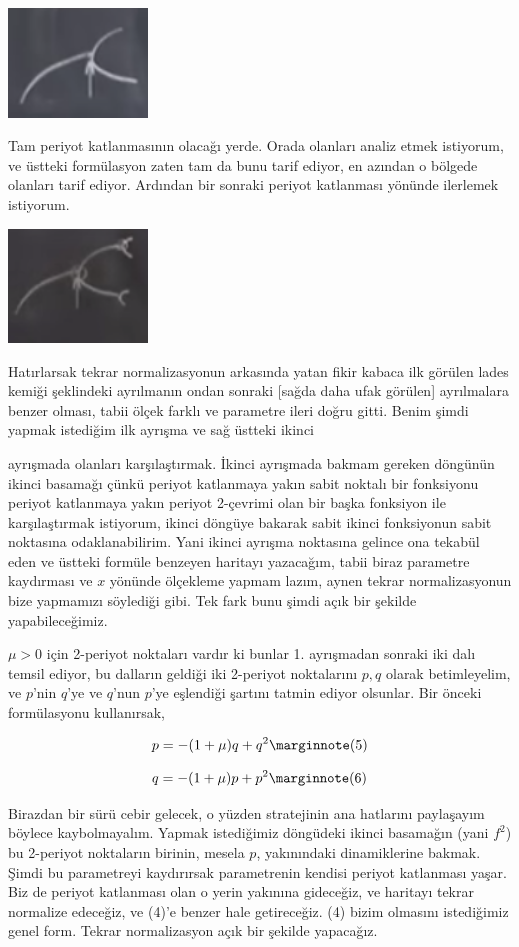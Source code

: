 \documentclass[12pt,fleqn]{article}\usepackage{../../common}
\begin{document}
\includegraphics[width=10em]{22_10.png}

Tam periyot katlanmasının olacağı yerde. Orada olanları analiz etmek
istiyorum, ve üstteki formülasyon zaten tam da bunu tarif ediyor, en
azından o bölgede olanları tarif ediyor. Ardından bir sonraki periyot
katlanması yönünde ilerlemek istiyorum.

\includegraphics[width=10em]{22_11.png}

Hatırlarsak tekrar normalizasyonun arkasında yatan fikir kabaca ilk görülen
lades kemiği şeklindeki ayrılmanın ondan sonraki [sağda daha ufak görülen]
ayrılmalara benzer olması, tabii ölçek farklı ve parametre ileri doğru
gitti. Benim şimdi yapmak istediğim ilk ayrışma ve sağ üstteki ikinci

ayrışmada olanları karşılaştırmak. İkinci ayrışmada bakmam gereken döngünün
ikinci basamağı çünkü periyot katlanmaya yakın sabit noktalı bir fonksiyonu
periyot katlanmaya yakın periyot 2-çevrimi olan bir başka fonksiyon ile
karşılaştırmak istiyorum, ikinci döngüye bakarak sabit ikinci fonksiyonun
sabit noktasına odaklanabilirim. Yani ikinci ayrışma noktasına gelince ona
tekabül eden ve üstteki formüle benzeyen haritayı yazacağım, tabii biraz
parametre kaydırması ve $x$ yönünde ölçekleme yapmam lazım, aynen tekrar
normalizasyonun bize yapmamızı söylediği gibi. Tek fark bunu şimdi açık bir
şekilde yapabileceğimiz.

$\mu > 0$ için 2-periyot noktaları vardır ki bunlar 1. ayrışmadan sonraki
iki dalı temsil ediyor, bu dalların geldiği iki 2-periyot noktalarını $p,q$
olarak betimleyelim, ve $p$'nin $q$'ye ve $q$'nun $p$'ye eşlendiği şartını
tatmin ediyor olsunlar. Bir önceki formülasyonu kullanırsak,

$$ p = -(1+\mu)q + q^2 
\mlabel{5} $$

$$ q = -(1+\mu)p + p^2 
\mlabel{6} $$

Birazdan bir sürü cebir gelecek, o yüzden stratejinin ana hatlarını paylaşayım
böylece kaybolmayalım. Yapmak istediğimiz döngüdeki ikinci basamağın (yani
$f^2$) bu 2-periyot noktaların birinin, mesela $p$, yakınındaki dinamiklerine
bakmak. Şimdi bu parametreyi kaydırırsak parametrenin kendisi periyot katlanması
yaşar. Biz de periyot katlanması olan o yerin yakınına gideceğiz, ve haritayı
tekrar normalize edeceğiz, ve (4)'e benzer hale getireceğiz. (4) bizim olmasını
istediğimiz genel form. Tekrar normalizasyon açık bir şekilde yapacağız. 
\end{document}
